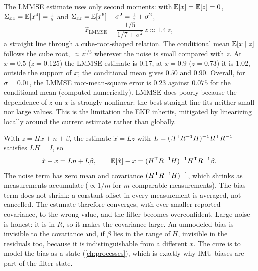 \begin{solutions}
  \item The LMMSE estimate uses only second moments: with $\mathbb{E}[x] = \mathbb{E}[z] = 0$, $\Sigma_{xz} = \mathbb{E}[x^4] = \tfrac15$ and $\Sigma_{zz} = \mathbb{E}[x^6] + \sigma^2 = \tfrac17 + \sigma^2$,
        \[
          \hat x_{\mathrm{LMMSE}} = \frac{1/5}{1/7 + \sigma^2}\,z \approx 1.4\,z ,
        \]
        a straight line through a cube-root-shaped relation. The conditional mean $\mathbb{E}[x\mid z]$ follows the cube root, $\approx z^{1/3}$ wherever the noise is
        small compared with $z$. At $x = 0.5$ ($z = 0.125$) the LMMSE estimate is $0.17$, at $x = 0.9$ ($z = 0.73$) it is $1.02$, outside the support of $x$;
        the conditional mean gives $0.50$ and $0.90$. Overall, for $\sigma = 0.01$, the LMMSE root-mean-square error is $0.23$ against $0.075$ for the
        conditional mean (computed numerically). LMMSE does poorly because the dependence of $z$ on $x$ is strongly nonlinear: the best straight line
        fits neither small nor large values. This is the limitation the EKF inherits, mitigated by linearizing locally around the current estimate
        rather than globally.

  \item With $z = Hx + n + \beta$, the estimate $\hat x = Lz$ with $L = (H^{\mathsf{T}} R^{-1} H)^{-1} H^{\mathsf{T}} R^{-1}$ satisfies $LH = I$, so
        \[
          \hat x - x = Ln + L\beta, \qquad \mathbb{E}[\hat x] - x = (H^{\mathsf{T}} R^{-1} H)^{-1} H^{\mathsf{T}} R^{-1}\beta .
        \]
        The noise term has zero mean and covariance $(H^{\mathsf{T}} R^{-1} H)^{-1}$, which shrinks as measurements accumulate ($\propto 1/m$ for $m$ comparable measurements).
        The bias term does not shrink: a constant offset in every measurement is averaged, not cancelled. The estimate therefore converges,
        with ever-smaller reported covariance, to the wrong value, and the filter becomes overconfident. Large noise is honest: it is in $R$, so it
        makes the covariance large. An unmodeled bias is invisible to the covariance and, if $\beta$ lies in the range of $H$, invisible in the residuals
        too, because it is indistinguishable from a different $x$. The cure is to model the bias as a state (\cref{ch:processes}), which is exactly
        why IMU biases are part of the filter state.
\end{solutions}
